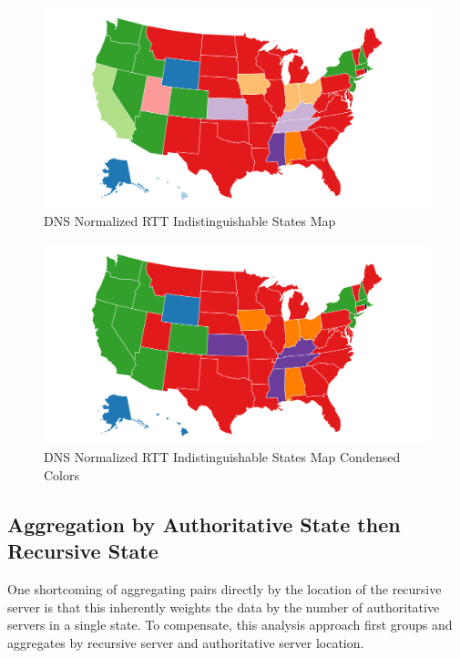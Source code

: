 \begin{figure}[H]
    \centering
    \includegraphics{images/dns/analysis_no_auth_agg/rtt_normalized/no_auth_distinct_norm_rtt_map.png}
    \caption{DNS Normalized RTT Indistinguishable States Map}
    \label{fig:dns_normalized_rtt_indistinguishable_states_map}
\end{figure}

\begin{figure}[H]
    \centering
    \includegraphics{images/dns/analysis_no_auth_agg/rtt_normalized/no_auth_distinct_norm_rtt_map_condensed.png}
    \caption{DNS Normalized RTT Indistinguishable States Map Condensed Colors}
    \label{fig:dns_normalized_rtt_indistinguishable_states_map_condensed_colors}
\end{figure}



\subsection{Aggregation by Authoritative State then Recursive State}

One shortcoming of aggregating pairs directly by the location of the recursive server is that this inherently weights the data by the number of authoritative servers in a single state. To compensate, this analysis approach first groups and aggregates by recursive server and authoritative server location. 

